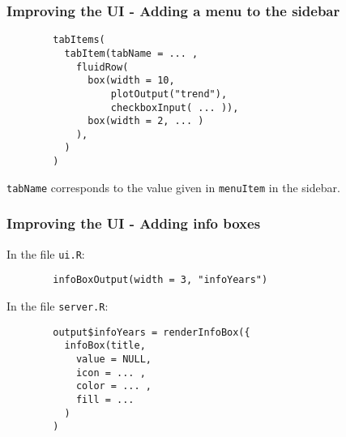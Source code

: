 \documentclass{beamer}
\begin{document}
	\begin{frame}[fragile]
		\frametitle{Improving the UI - Adding a menu to the sidebar}
		
		\begin{exampleblock}{}
		\begin{BVerbatim}
		tabItems(
		  tabItem(tabName = ... ,
		    fluidRow(
		      box(width = 10,
		          plotOutput("trend"),
		          checkboxInput( ... )),
		      box(width = 2, ... )
		    ),
		  )
		)
		\end{BVerbatim}
		\end{exampleblock}{}

		\vspace{1em}

		\verb|tabName| corresponds to the value given in \verb|menuItem| in the sidebar.

	\end{frame}

	\begin{frame}[fragile]
		\frametitle{Improving the UI - Adding info boxes}

		In the file \verb|ui.R|:
		
		\begin{exampleblock}{}
		\begin{BVerbatim}
		infoBoxOutput(width = 3, "infoYears")
		\end{BVerbatim}
		\end{exampleblock}{}

		\vspace{1em}

		In the file \verb|server.R|:
		
		\begin{exampleblock}{}
		\begin{BVerbatim}
		output$infoYears = renderInfoBox({
		  infoBox(title,
		    value = NULL,
		    icon = ... ,
		    color = ... ,
		    fill = ...
		  )
		)
		\end{BVerbatim}
		\end{exampleblock}{}

	\end{frame}
\end{document}
